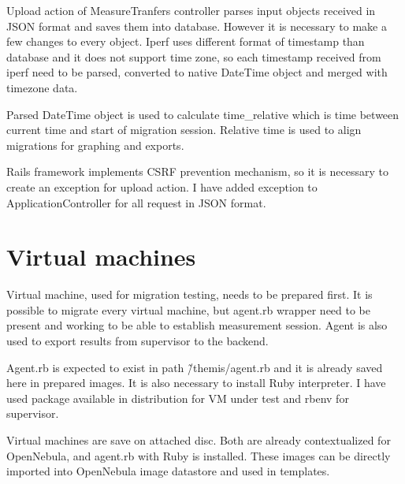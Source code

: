 Upload action of MeasureTranfers controller parses input objects received in \Ac{JSON} format and saves them into database. However it is necessary to make a few changes to every object. Iperf uses different format of timestamp than database and it does not support time zone, so each timestamp received from iperf need to be parsed, converted to native DateTime object and merged with timezone data. 

Parsed DateTime object is used to calculate time\_relative which is time between current time and start of migration session. Relative time is used to align migrations for graphing and exports.

Rails framework implements \Ac{CSRF} prevention mechanism, so it is necessary to create an exception for upload action. I have added exception to ApplicationController for all request in \Ac{JSON} format.


\section{Virtual machines}
Virtual machine, used for migration testing, needs to be prepared first. It is possible to migrate every virtual machine, but agent.rb wrapper need to be present and working to be able to establish measurement session. Agent is also used to export results from supervisor to the backend.

Agent.rb is expected to exist in path {\~/themis/agent.rb} and it is already saved here in prepared images. It is also necessary to install Ruby interpreter. I have used package available in distribution for \Ac{VM} under test and rbenv for supervisor.

Virtual machines are save on attached disc. Both are already contextualized for OpenNebula, and agent.rb with Ruby is installed. These images can be directly imported into OpenNebula image datastore and used in templates.

